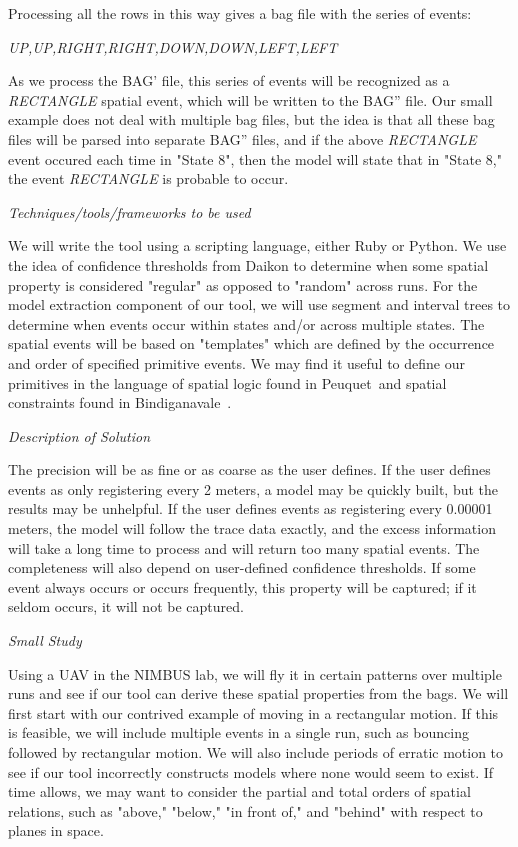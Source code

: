 Processing all the rows in this way gives a bag file with the series of events: 

\emph{UP,UP,RIGHT,RIGHT,DOWN,DOWN,LEFT,LEFT}

As we process the BAG' file, this series of events will be recognized as a \emph{RECTANGLE} spatial event, which will be written to the BAG'' file.  
Our small example does not deal with multiple bag files, but the idea is that all these bag files will be parsed into separate BAG'' files, and if the above \emph{RECTANGLE} event occured each time in "State 8", then the model will state that in "State 8," the event \emph{RECTANGLE} is probable to occur.

\emph{Techniques/tools/frameworks to be used}

We will write the tool using a scripting language, either Ruby or Python.
We use the idea of confidence thresholds from Daikon to determine when some spatial property is considered "regular" as opposed to "random" across runs. 
For the model extraction component of our tool, we will use segment and interval trees to determine when events occur within states and/or across multiple states.
The spatial events will be based on "templates" which are defined by the occurrence and order of specified primitive events.
We may find it useful to define our primitives in the language of spatial logic found in Peuquet~\etal and spatial constraints found in Bindiganavale~\etal. 

\emph{Description of Solution}

The precision will be as fine or as coarse as the user defines.
If the user defines events as only registering every 2 meters, a model may be quickly built, but the results may be unhelpful.
If the user defines events as registering every 0.00001 meters, the model will follow the trace data exactly, and the excess information will take a long time to process and will return too many spatial events.
The completeness will also depend on user-defined confidence thresholds.
If some event always occurs or occurs frequently, this property will be captured; if it seldom occurs, it will not be captured.  

\emph{Small Study}

Using a UAV in the NIMBUS lab, we will fly it in certain patterns over multiple runs and see if our tool can derive these spatial properties from the bags.
We will first start with our contrived example of moving in a rectangular motion.  
If this is feasible, we will include multiple events in a single run, such as bouncing followed by rectangular motion.
We will also include periods of erratic motion to see if our tool incorrectly constructs models where none would seem to exist.
If time allows, we may want to consider the partial and total orders of spatial relations, such as "above," "below," "in front of," and "behind" with respect to planes in space.

